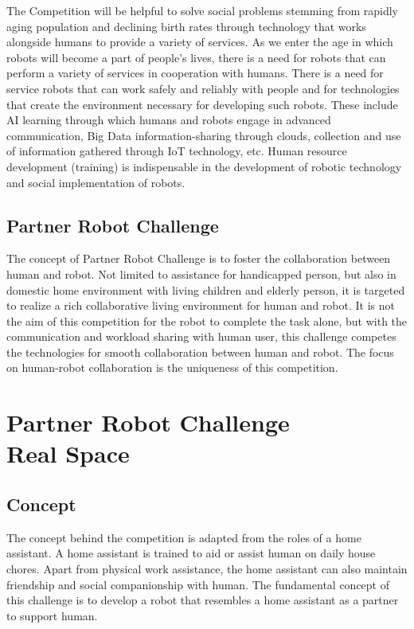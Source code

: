 \documentclass{article}
\begin{document}
The Competition will be helpful to solve social problems stemming from rapidly aging population and declining birth rates through technology that works alongside humans to provide a variety of services. As we enter the age in which robots will become a part of people's lives, there is a need for robots that can perform a variety of services in cooperation with humans. There is a need for service robots that can work safely and reliably with people and for technologies that create the environment necessary for developing such robots. These include AI learning through which humans and robots engage in advanced communication, Big Data information-sharing through clouds, collection and use of information gathered through IoT technology, etc. Human resource development (training) is indispensable in the development of robotic technology and social implementation of robots.

\subsection{Partner Robot Challenge}

The concept of Partner Robot Challenge is to foster the collaboration between human and robot. Not limited to assistance for handicapped person, but also in domestic home environment with living children and elderly person, it is targeted to realize a rich collaborative living environment for human and robot. It is not the aim of this competition for the robot to complete the task alone, but with the communication and workload sharing with human user, this challenge competes the technologies for smooth collaboration between human and robot. The focus on human-robot collaboration is the uniqueness of this competition.

\newpage
\section{Partner Robot Challenge \\Real Space}

\subsection{Concept}

The concept behind the competition is adapted from the roles of a home assistant. A home assistant is trained to aid or assist human on daily house chores. Apart from physical work assistance, the home assistant can also maintain friendship and social companionship with human. The fundamental concept of this challenge is to develop a robot that resembles a home assistant as a partner to support human.
\end{document}
